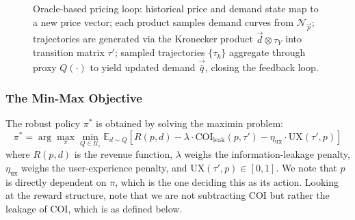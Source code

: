 \begin{figure}[ht]
\centering
{\setlength{\arraycolsep}{4pt}%
%
}
\caption{Oracle-based pricing loop: historical price and demand state map to a new price vector; each product samples demand curves from $\mathcal{N}_{\vec{p}}$; trajectories are generated via the Kronecker product $\vec{d}\otimes\tau_Y$ into transition matrix $\tau'$; sampled trajectories $\{\tau_k\}$ aggregate through proxy $Q(\cdot)$ to yield updated demand $\vec{\hat{q}}$, closing the feedback loop.}
\label{fig:oracle_flow}
\end{figure}

\subsubsection{The Min-Max Objective}
The robust policy $\pi^*$ is obtained by solving the maximin problem:
\begin{equation}
\label{eq:robust_policy}
\pi^* = \arg \max_{\pi} \min_{Q \in \mathcal{U}_\epsilon} \mathbb{E}_{d \sim Q} \left[ R(p, d) - \lambda \cdot \text{COI}_{\text{leak}}(p,\tau') - \eta_{\text{ux}} \cdot \text{UX}(\tau', p) \right]
\end{equation}
where $R(p, d)$ is the revenue function, $\lambda$ weighs the information-leakage penalty, $\eta_{\text{ux}}$ weighs the user-experience penalty, and $\text{UX}(\tau', p)\in[0,1]$. We note that $p$ is directly dependent on $\pi$, which is the one deciding this as its action.
Looking at the reward structure, note that we are not subtracting COI but rather the leakage of COI, which is as defined below.


